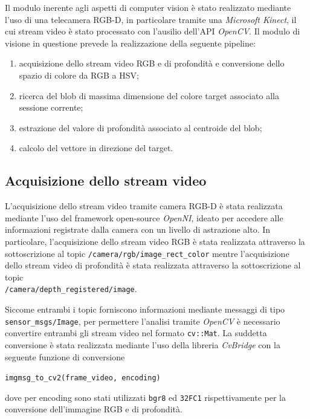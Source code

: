 Il modulo inerente agli aspetti di computer vision è stato realizzato mediante l'uso di una telecamera RGB-D, in particolare tramite una {\itshape Microsoft Kinect}, il cui stream video è stato processato con l'ausilio dell'API {\itshape OpenCV}.\newline
Il modulo di visione in questione prevede la realizzazione della seguente pipeline:
\begin{enumerate}
	\item acquisizione dello stream video RGB e di profondità e conversione dello spazio di colore da RGB a HSV;
	\item ricerca del blob di massima dimensione del colore target associato alla sessione corrente;
	\item estrazione del valore di profondità associato al centroide del blob;
	\item calcolo del vettore in direzione del target.
\end{enumerate}
\subsection{Acquisizione dello stream video}
L'acquisizione dello stream video tramite camera RGB-D è stata realizzata mediante l'uso del framework open-source {\itshape OpenNI}, ideato per accedere alle informazioni registrate dalla camera con un livello di astrazione alto. In particolare, l'acquisizione dello stream video RGB è stata realizzata attraverso la sottoscrizione al topic \texttt {/camera/rgb/image\_rect\_color} mentre l'acquisizione dello stream video di profondità è stata realizzata attraverso la sottoscrizione al topic \\
\texttt {/camera/depth\_registered/image}.

Siccome entrambi i topic forniscono informazioni mediante messaggi di tipo \texttt{sensor\_msgs/Image}, per permettere l'analisi tramite {\itshape OpenCV} è necessario convertire entrambi gli stream video nel formato \texttt {cv::Mat}. La suddetta conversione è stata realizzata mediante l'uso della libreria {\itshape CvBridge} con la seguente funzione di conversione
\begin{center}
	\texttt{imgmsg\_to\_cv2(frame\_video, encoding)}
\end{center}
dove per encoding sono stati utilizzati \texttt{bgr8} ed \texttt{32FC1} rispettivamente per la conversione dell'immagine RGB e di profondità.

